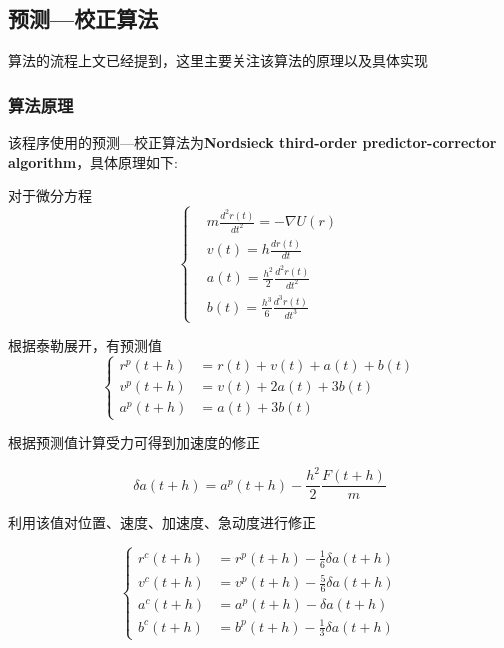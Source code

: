 \documentclass{ctexart}
\begin{document}
\subsection{预测—校正算法}

算法的流程上文已经提到，这里主要关注该算法的原理以及具体实现

\subsubsection{算法原理}

该程序使用的预测—校正算法为\textbf{Nordsieck third-order predictor-corrector algorithm}，具体原理如下:

对于微分方程
\begin{equation}
    \left\{
    \begin{aligned}
         & m\frac{d^2r(t)}{dt^2} = -\nabla U(r)     \\
         & v(t) = h\frac{dr(t)}{dt}                 \\
         & a(t) = \frac{h^2}{2}\frac{d^2r(t)}{dt^2} \\
         & b(t) = \frac{h^3}{6}\frac{d^3r(t)}{dt^3}
    \end{aligned}
    \right.
\end{equation}

根据泰勒展开，有预测值
\begin{equation}
    \left\{\begin{aligned}
        r^p(t + h) & = r(t) + v(t) + a(t) + b(t) \\
        v^p(t + h) & = v(t) + 2a(t) + 3b(t)      \\
        a^p(t + h) & = a(t) + 3b(t)
    \end{aligned}
    \right.
\end{equation}

根据预测值计算受力可得到加速度的修正

\begin{equation}
    \delta a(t + h) = a^p(t + h) - \frac{h^2}{2} \frac{F(t+h)}{m}
\end{equation}

利用该值对位置、速度、加速度、急动度进行修正

\begin{equation}
    \left\{\begin{aligned}
        r^c(t + h) & = r^p(t+h) - \frac{1}{6}\delta a(t+h) \\
        v^c(t + h) & = v^p(t+h) - \frac{5}{6}\delta a(t+h) \\
        a^c(t + h) & = a^p(t+h) - \delta a(t+h)            \\
        b^c(t + h) & = b^p(t+h) - \frac{1}{3}\delta a(t+h)
    \end{aligned}
    \right.
\end{equation}
\end{document}
